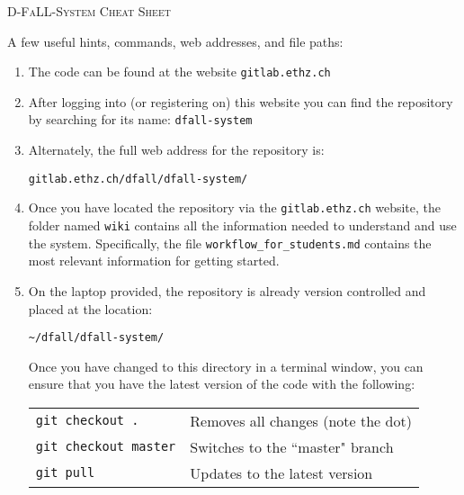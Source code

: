 \documentclass[]{report}
\newcommand{\gitwebaddress}{gitlab.ethz.ch/dfall/dfall-system/}
\newcommand{\repositoryname}{dfall-system}
\newcommand{\repositoryrootpath}{\textasciitilde/dfall/dfall-system/}
\begin{document}
	
\begin{center}
	\huge{\textsc{D-FaLL-System Cheat Sheet}}
\end{center}

\noindent
A few useful hints, commands, web addresses, and file paths:
	\begin{enumerate}[topsep=-1pt , itemsep=1pt ,  label = \textbf{(\arabic{*})} ]
		\item The code can be found at the website \texttt{gitlab.ethz.ch}
		
		\item After logging into (or registering on) this website you can find the repository by searching for its name: \texttt{\repositoryname}
		
		\item Alternately, the full web address for the repository is:
		
		\begin{center}
			\large{\texttt{\gitwebaddress}}
		\end{center}
		
		
		\item Once you have located the repository via the \texttt{gitlab.ethz.ch} website, the folder named \texttt{wiki} contains all the information needed to understand and use the system. Specifically, the file \texttt{workflow\_for\_students.md} contains the most relevant information for getting started.
		
		\item On the laptop provided, the repository is already version controlled and placed at the location:
		
		\begin{center}
			\large{\texttt{\repositoryrootpath}}
		\end{center}
		
		Once you have changed to this directory in a terminal window, you can ensure that you have the latest version of the code with the following:
		
		\begin{center}
			\begin{tabular}{ll}
				\large{\texttt{git checkout .}}
					& Removes all changes (note the dot)
				\\
				\large{\texttt{git checkout master}}
					& Switches to the ``master" branch
				\\
				\large{\texttt{git pull}}
					& Updates to the latest version
			\end{tabular}
		\end{center}
		

\end{enumerate}
\end{document}
